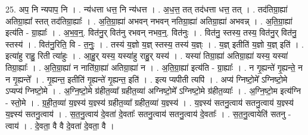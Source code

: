 \documentclass[17pt]{extarticle}
\begin{document}
25. अप॒ नि न्यपाप॒ नि । . न्य॑धत्ता धत्त॒ नि न्य॑धत्त । . अ॒ध॒त्त॒ तत् तद॑धत्ता धत्त॒ तत् । . तद॑तिग्रा॒ह्या॑ अतिग्रा॒ह्या᳚ स्तत् तद॑तिग्रा॒ह्याः᳚ । . अ॒ति॒ग्रा॒ह्या॑ अभवन् नभवन् नतिग्रा॒ह्या॑ अतिग्रा॒ह्या॑ अभवन्न् । . अ॒ति॒ग्रा॒ह्या॑ इत्य॑ति - ग्रा॒ह्याः᳚ । . अ॒भ॒व॒न्॒. वित॑नु॒र् वित॑नु रभवन् नभव॒न्॒. वित॑नुः । . वित॑नु॒ स्तस्य॒ तस्य॒ वित॑नु॒र् वित॑नु॒ स्तस्य॑ । . वित॑नु॒रिति॒ वि - त॒नुः॒ । . तस्य॑ य॒ज्ञो य॒ज्ञ् स्तस्य॒ तस्य॑ य॒ज्ञ्ः । . य॒ज्ञ् इतीति॑ य॒ज्ञो य॒ज्ञ् इति॑ । . इत्या॑हु राहु॒ रिती त्या॑हुः । . आ॒हु॒र् यस्य॒ यस्या॑हु राहु॒र् यस्य॑ । . यस्या॑ तिग्रा॒ह्या॑ अतिग्रा॒ह्या॑ यस्य॒ यस्या॑ तिग्रा॒ह्याः᳚ । . अ॒ति॒ग्रा॒ह्या॑ न नाति॑ग्रा॒ह्या॑ अतिग्रा॒ह्या॑ न । . अ॒ति॒ग्रा॒ह्या॑ इत्य॑ति - ग्रा॒ह्याः᳚ । . न गृ॒ह्यन्ते॑ गृ॒ह्यन्ते॒ न न गृ॒ह्यन्ते᳚ । . गृ॒ह्यन्त॒ इतीति॑ गृ॒ह्यन्ते॑ गृ॒ह्यन्त॒ इति॑ । . इत्य प्यपीती त्यपि॑ । . अप्य॑ ग्निष्टो॒मे᳚ ऽग्निष्टो॒मे ऽप्यप्य॑ ग्निष्टो॒मे । . अ॒ग्नि॒ष्टो॒मे ग्र॑हीत॒व्या᳚ ग्रहीत॒व्या॑ अग्निष्टो॒मे᳚ ऽग्निष्टो॒मे ग्र॑हीत॒व्याः᳚ । . अ॒ग्नि॒ष्टो॒म इत्य॑ग्नि - स्तो॒मे । . ग्र॒ही॒त॒व्या॑ य॒ज्ञ्स्य॑ य॒ज्ञ्स्य॑ ग्रहीत॒व्या᳚ ग्रहीत॒व्या॑ य॒ज्ञ्स्य॑ । . य॒ज्ञ्स्य॑ सतनु॒त्वाय॑ सतनु॒त्वाय॑ य॒ज्ञ्स्य॑ य॒ज्ञ्स्य॑ सतनु॒त्वाय॑ । . स॒त॒नु॒त्वाय॑ दे॒वता॑ दे॒वताः᳚ सतनु॒त्वाय॑ सतनु॒त्वाय॑ दे॒वताः᳚ । . स॒त॒नु॒त्वायेति॑ सतनु - त्वाय॑ । . दे॒वता॒ वै वै दे॒वता॑ दे॒वता॒ वै । \newline
\end{document}
